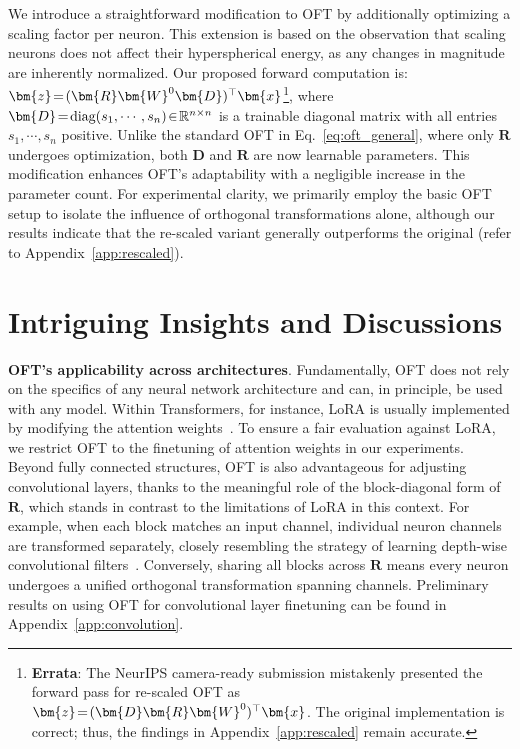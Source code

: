 We introduce a straightforward modification to OFT by additionally optimizing a scaling factor per neuron. This extension is based on the observation that scaling neurons does not affect their hyperspherical energy, as any changes in magnitude are inherently normalized. Our proposed forward computation is: $\thickmuskip=2mu \medmuskip=2mu\bm{z}=(\bm{R}\bm{W}^0\bm{D})^\top\bm{x}$\footnote{\textbf{Errata}: The NeurIPS camera-ready submission mistakenly presented the forward pass for re-scaled OFT as $\thickmuskip=2mu \medmuskip=2mu\bm{z}=(\bm{D}\bm{R}\bm{W}^0)^\top\bm{x}$. The original implementation is correct; thus, the findings in Appendix~\ref{app:rescaled} remain accurate.}, where $\thickmuskip=2mu \medmuskip=2mu\bm{D} = \text{diag}(s_1, \cdots, s_n) \in \mathbb{R}^{n \times n}$ is a trainable diagonal matrix with all entries $s_1,\cdots,s_n$ positive. Unlike the standard OFT in Eq.~\eqref{eq:oft_general}, where only $\bm{R}$ undergoes optimization, both $\bm{D}$ and $\bm{R}$ are now learnable parameters. This modification enhances OFT’s adaptability with a negligible increase in the parameter count. For experimental clarity, we primarily employ the basic OFT setup to isolate the influence of orthogonal transformations alone, although our results indicate that the re-scaled variant generally outperforms the original (refer to Appendix~\ref{app:rescaled}).

\section{Intriguing Insights and Discussions}

\textbf{OFT’s applicability across architectures}. Fundamentally, OFT does not rely on the specifics of any neural network architecture and can, in principle, be used with any model. Within Transformers, for instance, LoRA is usually implemented by modifying the attention weights~\cite{hulora2022}. To ensure a fair evaluation against LoRA, we restrict OFT to the finetuning of attention weights in our experiments. Beyond fully connected structures, OFT is also advantageous for adjusting convolutional layers, thanks to the meaningful role of the block-diagonal form of $\bm{R}$, which stands in contrast to the limitations of LoRA in this context. For example, when each block matches an input channel, individual neuron channels are transformed separately, closely resembling the strategy of learning depth-wise convolutional filters~\cite{chollet2017xception}. Conversely, sharing all blocks across $\bm{R}$ means every neuron undergoes a unified orthogonal transformation spanning channels. Preliminary results on using OFT for convolutional layer finetuning can be found in Appendix~\ref{app:convolution}.

